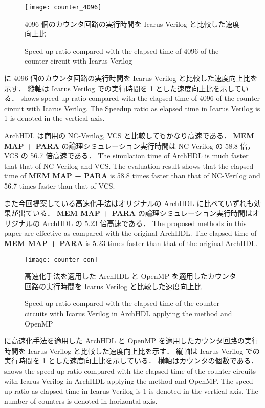 \begin{figure}[tb]
 \centering
 \texttt{[image: counter\_4096]}
 \caption{4096 個のカウンタ回路の実行時間を Icarus Verilog と比較した速度向上比}
\fi
 \caption{Speed up ratio compared with the elapsed time of 4096 of the counter circuit with Icarus Verilog}
 \label{fig:counter4096}
\end{figure}

 に 4096 個のカウンタ回路の実行時間を Icarus Verilog と比較した速度向上比を示す．
縦軸は Icarus Verilog での実行時間を 1 とした速度向上比を示している．
\fi
{} shows speed up ratio compared with the elapsed time of 4096 of the counter circuit with Icarus Verilog.
The Speedup ratio as elapsed time in Icarus Verilog is 1 is denoted in the vertical axis.

ArchHDL は商用の NC-Verilog, VCS と比較してもかなり高速である．
\textbf{MEM MAP + PARA} の論理シミュレーション実行時間は NC-Verilog の 58.8 倍，VCS の 56.7 倍高速である．
\fi
The simulation time of ArchHDL is much faster that that of NC-Verilog and VCS.
The evaluation result shows that the elapsed time of \textbf{MEM MAP + PARA} is 58.8 times faster than that of NC-Verilog and 56.7 times faster than that of VCS.

また今回提案している高速化手法はオリジナルの ArchHDL に比べていずれも効果が出ている．
\textbf{MEM MAP + PARA} の論理シミュレーション実行時間はオリジナルの ArchHDL の 5.23 倍高速である．
\fi
The proposed methods in this paper are effective as compared with the original ArchHDL.
The elapsed time of \textbf{MEM MAP + PARA} is 5.23 times faster than that of the original ArchHDL.



\begin{figure}[tb]
 \centering
 \texttt{[image: counter\_con]}
 \caption{高速化手法を適用した ArchHDL と OpenMP を適用したカウンタ回路の実行時間を Icarus Verilog と比較した速度向上比}
\fi
 \caption{Speed up ratio compared with the elapsed time of the counter circuits with Icarus Verilog in ArchHDL applying the method and OpenMP}
 \label{fig:counter_con}
\end{figure}

 に高速化手法を適用した ArchHDL と OpenMP を適用したカウンタ回路の実行時間を Icarus Verilog と比較した速度向上比を示す．
縦軸は Icarus Verilog での実行時間を 1 とした速度向上比を示している．
横軸はカウンタの個数である．
\fi
{} shows the speed up ratio compared with the elapsed time of the counter circuits with Icarus Verilog in ArchHDL applying the method and OpenMP.
The speed up ratio as elapsed time in Icarus Verilog is 1 is denoted in the vertical axis.
The number of counters is denoted in horizontal axis.

